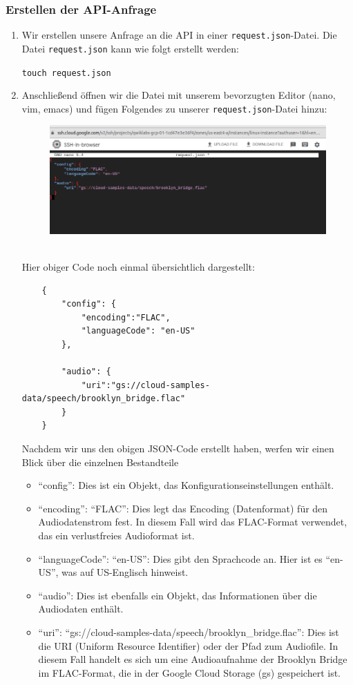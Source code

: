 \documentclass[12pt,a4paper]{article}
\begin{document}
\subsubsection{Erstellen der API-Anfrage}
\begin{enumerate}
\item Wir erstellen unsere Anfrage an die API in einer \texttt{request.json}-Datei. Die Datei \texttt{request.json} kann wie folgt erstellt werden:
\begin{center}
\verb|touch request.json|
\end{center}
\item Anschließend öffnen wir die Datei mit unserem bevorzugten Editor (nano, vim, emacs) und fügen Folgendes zu unserer \texttt{request.json}-Datei hinzu:
\begin{figure}[h!]
\centering
\includegraphics[width=0.9\linewidth]{../images/request_json}
\label{fig:requestjson}
\end{figure}
\ \\
Hier obiger Code noch einmal übersichtlich dargestellt:
\begin{verbatim}
	{
		"config": {
			"encoding":"FLAC",
			"languageCode": "en-US"
		},
	
		"audio": {
			"uri":"gs://cloud-samples-data/speech/brooklyn_bridge.flac"
		}
	}
\end{verbatim}
Nachdem wir uns den obigen JSON-Code erstellt haben, werfen wir einen Blick über die einzelnen Bestandteile
\begin{itemize}
	\item \enquote{config}: Dies ist ein Objekt, das Konfigurationseinstellungen enthält.
	
	\item \enquote{encoding}: \enquote{FLAC}: Dies legt das Encoding (Datenformat) für den Audiodatenstrom fest. In diesem Fall wird das FLAC-Format verwendet, das ein verlustfreies Audioformat ist.
	
	\item \enquote{languageCode}: \enquote{en-US}: Dies gibt den Sprachcode an. Hier ist es \enquote{en-US}, was auf US-Englisch hinweist.
	
	\item \enquote{audio}: Dies ist ebenfalls ein Objekt, das Informationen über die Audiodaten enthält.
	
	\item \enquote{uri}: \enquote{gs://cloud-samples-data/speech/brooklyn\_bridge.flac}: Dies ist die URI (Uniform Resource Identifier) oder der Pfad zum Audiofile. In diesem Fall handelt es sich um eine Audioaufnahme der Brooklyn Bridge im FLAC-Format, die in der Google Cloud Storage (gs) gespeichert ist.
\end{itemize}
\end{enumerate}
\end{document}
